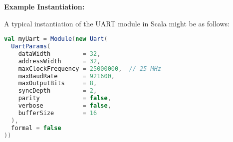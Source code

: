 \label{table:uart_params}
\endgroup


\textbf{Example Instantiation:}

A typical instantiation of the UART module in Scala might be as follows:

\begin{lstlisting}[language=Scala]
val myUart = Module(new Uart(
  UartParams(
    dataWidth         = 32,
    addressWidth      = 32,
    maxClockFrequency = 25000000,  // 25 MHz
    maxBaudRate       = 921600,
    maxOutputBits     = 8,
    syncDepth         = 2,
    parity            = false,
    verbose           = false,
    bufferSize        = 16
  ),
  formal = false
))
\end{lstlisting}